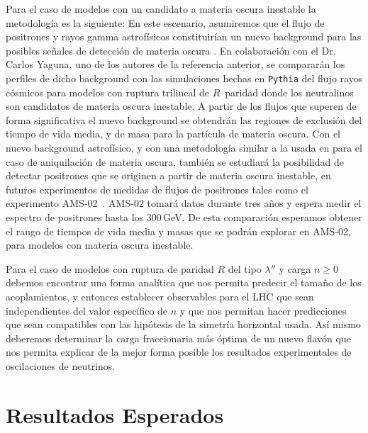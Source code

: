 \documentclass[11pt]{article}
\begin{document}
Para el caso de modelos con un candidato a materia oscura inestable la metodología es la siguiente:
En este escenario, asumiremos que el flujo de positrones y rayos gamma astrofísicos constituirían un nuevo background para las posibles señales de detección de materia oscura \cite{Choi:2009qc}. En colaboración con el Dr. Carlos Yaguna, uno de los autores de la referencia anterior, se compararán los perfiles de dicho background  con las simulaciones hechas en \texttt{Pythia} \cite{Sjostrand:2006za} del flujo rayos cósmicos para modelos con ruptura trilineal de $R$--paridad donde los neutralinos son candidatos de materia oscura inestable. A partir de los flujos que superen de forma significativa el nuevo background se obtendrán las regiones de exclusión del  tiempo de vida media, y de masa para la partícula de materia oscura. Con el nuevo background  astrofísico, y con una metodología similar a la usada en \cite{Choi:2009qc} para  el caso de aniquilación de materia oscura, también se estudiará la posibilidad de detectar positrones que se originen a partir de materia oscura inestable, en futuros experimentos de medidas de flujos de positrones tales como el experimento AMS-02~\cite{ams:2009}. AMS-02 tomará datos durante tres años y espera medir el espectro de positrones hasta los $300\,$GeV. De esta comparación esperamos obtener el rango de tiempos de vida media y masas que se podrán explorar en AMS-02, para modelos con materia oscura inestable.


Para el caso de modelos con ruptura de paridad $R$ del tipo $\lambda''$ y carga $n\ge 0$ debemos encontrar una forma analítica que nos permita predecir el tamaño de los acoplamientos, y entonces establecer observables para el LHC que sean independientes del valor específico de $n$ y que nos permitan hacer predicciones que sean compatibles con las hipótesis de la simetría horizontal usada. Así mismo deberemos determinar la carga fraccionaria más óptima de un nuevo flavón que nos permita explicar de la mejor forma posible los resultados experimentales de oscilaciones de neutrinos.


\section{ Resultados Esperados }
\end{document}
